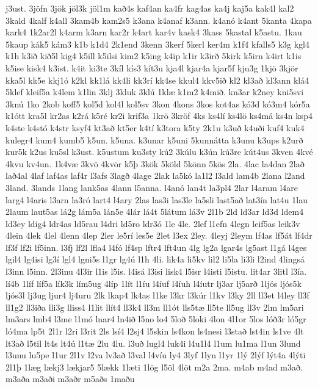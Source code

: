 {j3ust.
3jöfn
3jök
jöl3k
jöl1m
kað4s
kaf4an
ka4fr
kag4as
ka4j
kaj5a
kak4l
kal2
3kald
4kalf
k4all
3kam4b
kam2s5
k3ana
k4anaf
k3ann.
k4anó
k4ant
5kanta
4kapa
kark4
1k2ar2l
k4arm
k3arn
kar2r
k4art
kar4v
kask4
3kass
5kastal
k5astu.
1kau
5kaup
kák5
kám3
k1b
k1d4
2k1end
3kenn
3kerf
5kerl
ker4m
k1f4
kfalls5
k3g
kgl4
k1h
k3ið
kið5l
kig4
k5ill
k5ilsi
kim2
k5ing
k4ip
k1ir
k3irð
5kirk
k5irn
k4irt
k1is
k5ise
kisk4
k3ist.
k4it
ki3te
3kíl
kís3
kít3u
kja4l
kjar4a
kjar5f
kju3g
1kjö
3kjör
kka5l
kk5e
kkj1ó
k2kl
kk1lá
kk4li
kk3rí
kk4se
kkul4
kkv5ið
kl2
kl3að
kl3ann
klá4
5klef
kleif5a
k4lem
k1lin
3klj
3kluk
3klú
1klæ
k1m2
k4mið.
kn3ar
k2ney
kni5svi
3knú
1ko
2kob
koff5
kol5d
kol4l
kol5sv
3kon
4kons
3kos
kot4as
kó3d
kó3m4
kór5a
k1ótt
kra5l
kr2as
k2rá
k5ré
kr2i
krif3a
1krö
3kröf
4ks
ks4lí
ks4lö
ks4má
ks4n
ksp4
k4ste
k4stó
k4str
ksyf4
kt3að
kt5er
k4tí
k3tora
k5ty
2k1u
k3uð
k4uði
kuf4
kuk4
kulegr4
kum4
kumb5
k5un.
k5una.
k3unar
k5uni
5kunnátta
k3unu
k3ups
k2urð
kur5k
k2us
ku5sl
k3ust.
k5ustum
ku3sty
kú2
3kúlu
k3ún
kú3re
kút4us
3kven
4kvé
4kvu
kv4un.
1k4væ
3kvö
4kvör
k5þ
3kök
5köld
5könn
5kös
2la.
4lac
la4dan
2lað
lað4al
4laf
laf4as
laf4r
l3afs
3lagð
4lage
2lak
la5kó
la1l2
l3ald
lam4b
2lana
l2and
3land.
3lands
1lang
lank5as
4lann
l5anna.
l4anó
lan4t
la3pl4
2lar
l4aram
l4are
larg4
l4aris
l3arn
la3ró
lart4
l4ary
2las
las3i
las3le
la5sli
last5að
lat3ín
lat4u
1lau
2laum
laut5as
lá2g
lám5a
lán5e
4lár
lá4t
5látum
lá3v
2l1b
2ld
ld3ar
ld3d
ldem4
ld3ey
ldig4
ldr4as
ld5rau
l4dri
ld5ro
ldr3ó
1le
4le.
2lef
l1efn
4legn
leif5as
leik3v
4lein
4lek
4lel
4lenn
4lep
2ler
le5rí
les5e
2let
l3ex
2ley.
4leyj
2leym
lf4as
lf5át
lf4dr
lf3f
lf2i
lf5inn.
l3fj
lf2l
lfla4
l4fó
lf4sp
lftr4
lft4un
4lg
lg2a
lgar4s
lg5ast
l1gá
l4ges
lgil4
lg4isi
lg3í
lgl4
lgni5s
l1gr
lg4ú
l1h
4li.
lik4a
li5kv
lil2
li5la
li3li
l2ind
4lingsá
l3inn
l5inn.
2l3inu
4l3ir
l1is
l5is.
l4isá
l3isi
lisk4
l5isr
l4isti
l5istu.
lit4ar
3litl
l3ía.
lí4b
1líf
líf5a
lík3k
lím5ug
4líp
1lít
l1íu
l4íuf
l4íuh
l4íutr
lj3ar
lj5arð
1ljós
ljós5k
ljós3l
lj3ug
ljur4
lj4uru
2lk
lkap4
lk4as
l1ke
l3kr
l3kúr
l1kv
l3ky
2ll
ll3et
l4ley
ll3f
ll1g2
ll3iða
lli3g
lliss4
l1lit
llít4
ll3k4
ll3m
ll1ót
lls5tæ
ll5te
ll5ug
ll3v
2lm
lm5ari
lm3ars
lmb4
l3me
l1mó
lnar4
ln4ið
l5no
lo4
5loð
5loki
4lon
4l1or
5los
lóð3r
ló5gr
ló4ma
lp5t
2l1r
l2ri
l3rit
2ls
lsí4
l2sj4
l5skin
ls4kon
ls4nesi
l3stað
lst4in
ls1ve
4lt
lt3að
l5til
lt4s
lt4ú
l1tæ
2lu
4lu.
l3uð
lugl4
luk4i
l4u1l4
l1um
lu1ma
l1un
3lund
l3unu
lu5pe
l1ur
2l1v
l2va
lv3að
l3val
l4víu
ly4
3lyf
1lyn
l1yr
1lý
2lýf
lýt4a
4lýti
2l1þ
1læg
lækj3
lækjar5
5lækk
1læti
1lög
l5öl
4löt
m2a
2ma.
m4ab
m4ad
m3að.
m3aða
m3aði
m3aðr
m5aðs
1maðu
}
